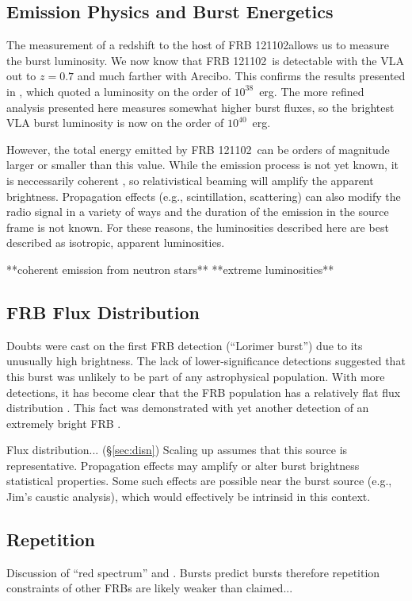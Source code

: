 \documentclass[twocolumn]{aastex61}
\newcommand{\frb}{FRB 121102}
\begin{document}
\subsection{Emission Physics and Burst Energetics}
The measurement of a redshift to the host of \frb allows us to measure the burst luminosity. We now know that \frb\ is detectable with the VLA out to $z=0.7$ and much farther with Arecibo. This confirms the results presented in \citet{LOC}, which quoted a luminosity on the order of $10^{38}$\ erg. The more refined analysis presented here measures somewhat higher burst fluxes, so the brightest VLA burst luminosity is now on the order of $10^{40}$\ erg. 

However, the total energy emitted by \frb\ can be orders of magnitude larger or smaller than this value. While the emission process is not yet known, it is neccessarily coherent \citep{2016Natur.531..202S, WEIRD}, so relativistical beaming will amplify the apparent brightness. Propagation effects (e.g., scintillation, scattering) can also modify the radio signal in a variety of ways \citep{CORDES} and the duration of the emission in the source frame is not known. For these reasons, the luminosities described here are best described as isotropic, apparent luminosities. 

**coherent emission from neutron stars** **extreme luminosities**
\citep{2016MNRAS.462..941L, 2016MNRAS.457..232C}


\subsection{FRB Flux Distribution}
Doubts were cast on the first FRB detection (``Lorimer burst'') due to its unusually high brightness. The lack of lower-significance detections suggested that this burst was unlikely to be part of any astrophysical population. With more detections, it has become clear that the FRB population has a relatively flat flux distribution \citep{2016ApJ...830...75V, 2016arXiv160206099L, 2016arXiv161100458L}. This fact was demonstrated with yet another detection of an extremely bright FRB \citep{2016arXiv161105758R}.


Flux distribution... (\S \ref{sec:disn})
Scaling up assumes that this source is representative. Propagation effects may amplify or alter burst brightness statistical properties. Some such effects are possible near the burst source (e.g., Jim's caustic analysis), which would effectively be intrinsid in this context.

\subsection{Repetition}
Discussion of ``red spectrum'' and \citet{2016MNRAS.458L..89C}. Bursts predict bursts therefore repetition constraints of other FRBs are likely weaker than claimed...
\end{document}

